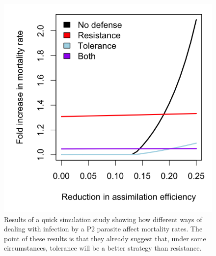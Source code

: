\documentclass[12pt,reqno,final,pdftex]{amsart}\usepackage[]{graphicx}\usepackage[]{color}
\newenvironment{knitrout}{}{} %
\theoremstyle{plain}
\numberwithin{equation}{part}
\begin{document}
\begin{knitrout}\scriptsize
{}\color{fgcolor}\begin{figure}

\includegraphics[width=\linewidth]{figure/unnamed-chunk-4-1} \hfill{}

\caption[Results of a quick simulation study showing how different ways of dealing with infection by a P2 parasite affect mortality rates]{Results of a quick simulation study showing how different ways of dealing with infection by a P2 parasite affect mortality rates. The point of these results is that they already suggest that, under some circumstances, tolerance will be a better strategy than resistance.}\label{fig:unnamed-chunk-4}
\end{figure}


\end{knitrout}
\end{document}
